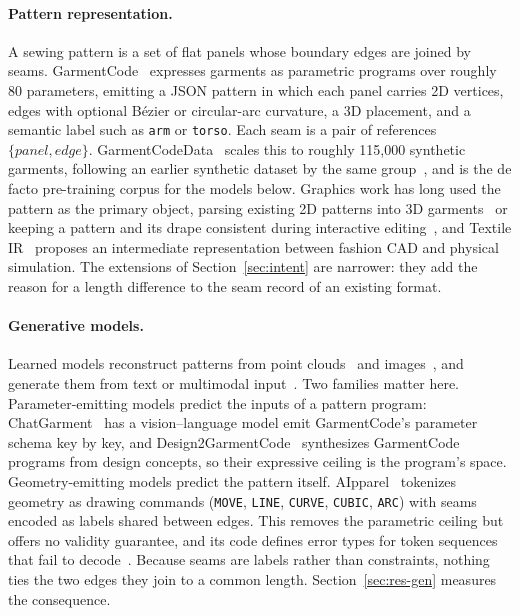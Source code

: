 \documentclass[10pt,twocolumn]{article}
\newcommand{\code}[1]{\texttt{\small #1}}
\begin{document}
\paragraph{Pattern representation.}
A sewing pattern is a set of flat panels whose boundary edges are joined by
seams. GarmentCode~\citep{garmentcode} expresses garments as parametric
programs over roughly 80 parameters, emitting a JSON pattern in which each
panel carries 2D vertices, edges with optional B\'ezier or circular-arc
curvature, a 3D placement, and a semantic label such as \code{arm} or
\code{torso}. Each seam is a pair of references $\{\textit{panel},
\textit{edge}\}$. GarmentCodeData~\citep{gcdata} scales this to roughly
115{,}000 synthetic garments, following an earlier synthetic dataset by the
same group~\citep{korosteleva2021}, and is the de facto pre-training corpus for
the models below. Graphics work has long used the pattern as the primary
object, parsing existing 2D patterns into 3D garments~\citep{berthouzoz2013} or
keeping a pattern and its drape consistent during interactive
editing~\citep{sensitivecouture}, and Textile IR~\citep{textileir} proposes an
intermediate representation between fashion CAD and physical simulation. The
extensions of Section~\ref{sec:intent} are narrower: they add the reason for a
length difference to the seam record of an existing format.

\paragraph{Generative models.}
Learned models reconstruct patterns from point clouds~\citep{neuraltailor} and
images~\citep{sewformer,panelformer}, and generate them from text or
multimodal input~\citep{dresscode,sewingldm,garmentdiffusion,garmentimage}.
Two families matter here. Parameter-emitting models predict the inputs of a
pattern program: ChatGarment~\citep{chatgarment} has a vision--language model
emit GarmentCode's parameter schema key by key, and
Design2GarmentCode~\citep{design2garmentcode} synthesizes GarmentCode programs
from design concepts, so their expressive ceiling is the program's space.
Geometry-emitting models predict the pattern itself. AIpparel~\citep{aipparel}
tokenizes geometry as drawing commands (\code{MOVE}, \code{LINE},
\code{CURVE}, \code{CUBIC}, \code{ARC}) with seams encoded as labels shared
between edges. This removes the parametric ceiling but offers no validity
guarantee, and its code defines error types for token sequences that fail to
decode~\citep{aipparelrepo}. Because seams are labels rather than constraints,
nothing ties the two edges they join to a common length. Section~\ref{sec:res-gen}
measures the consequence.
\end{document}
